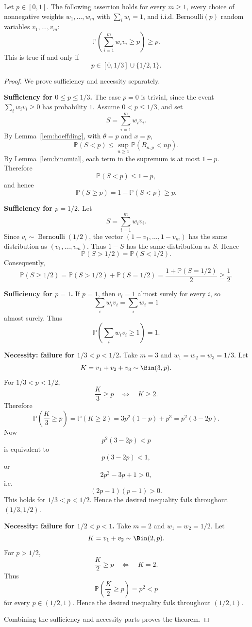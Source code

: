 \begin{theorem}
\label{thm:main}
Let \(p\in[0,1]\). The following assertion holds for every \(m\ge1\), every
choice of nonnegative weights \(w_1,\ldots,w_m\) with \(\sum_i w_i=1\), and
i.i.d. Bernoulli\((p)\) random variables \(v_1,\ldots,v_m\):
\[
\mathbb P\!\left(\sum_{i=1}^m w_i v_i\ge p\right)\ge p.
\]
This is true if and only if
\[
p\in[0,1/3]\cup\{1/2,1\}.
\]
\end{theorem}

\begin{proof}
We prove sufficiency and necessity separately.

\medskip

\noindent\textbf{Sufficiency for \(0\le p\le 1/3\).}
The case \(p=0\) is trivial, since the event
\(\sum_i w_i v_i\ge0\) has probability \(1\). Assume \(0<p\le1/3\), and set
\[
S=\sum_{i=1}^m w_i v_i .
\]
By Lemma~\ref{lem:hoeffding}, with \(\theta=p\) and \(x=p\),
\[
\mathbb P(S<p)
\le
\sup_{n\ge1}\mathbb P(B_{n,p}<np).
\]
By Lemma~\ref{lem:binomial}, each term in the supremum is at most \(1-p\).
Therefore
\[
\mathbb P(S<p)\le 1-p,
\]
and hence
\[
\mathbb P(S\ge p)=1-\mathbb P(S<p)\ge p.
\]

\medskip

\noindent\textbf{Sufficiency for \(p=1/2\).}
Let
\[
S=\sum_{i=1}^m w_i v_i .
\]
Since \(v_i\sim\operatorname{Bernoulli}(1/2)\), the vector
\((1-v_1,\ldots,1-v_m)\) has the same distribution as
\((v_1,\ldots,v_m)\). Thus \(1-S\) has the same distribution as \(S\). Hence
\[
\mathbb P(S>1/2)=\mathbb P(S<1/2).
\]
Consequently,
\[
\mathbb P(S\ge1/2)
=
\mathbb P(S>1/2)+\mathbb P(S=1/2)
=
\frac{1+\mathbb P(S=1/2)}2
\ge \frac12.
\]

\medskip

\noindent\textbf{Sufficiency for \(p=1\).}
If \(p=1\), then \(v_i=1\) almost surely for every \(i\), so
\[
\sum_i w_i v_i=\sum_i w_i=1
\]
almost surely. Thus
\[
\mathbb P\!\left(\sum_i w_i v_i\ge1\right)=1.
\]

\medskip

\noindent\textbf{Necessity: failure for \(1/3<p<1/2\).}
Take \(m=3\) and \(w_1=w_2=w_3=1/3\). Let
\[
K=v_1+v_2+v_3\sim \Bin(3,p).
\]
For \(1/3<p<1/2\),
\[
\frac K3\ge p
\quad\Longleftrightarrow\quad
K\ge2.
\]
Therefore
\[
\mathbb P\!\left(\frac K3\ge p\right)
=
\mathbb P(K\ge2)
=
3p^2(1-p)+p^3
=
p^2(3-2p).
\]
Now
\[
p^2(3-2p)<p
\]
is equivalent to
\[
p(3-2p)<1,
\]
or
\[
2p^2-3p+1>0,
\]
i.e.
\[
(2p-1)(p-1)>0.
\]
This holds for \(1/3<p<1/2\). Hence the desired inequality fails throughout
\((1/3,1/2)\).

\medskip

\noindent\textbf{Necessity: failure for \(1/2<p<1\).}
Take \(m=2\) and \(w_1=w_2=1/2\). Let
\[
K=v_1+v_2\sim \Bin(2,p).
\]
For \(p>1/2\),
\[
\frac K2\ge p
\quad\Longleftrightarrow\quad
K=2.
\]
Thus
\[
\mathbb P\!\left(\frac K2\ge p\right)=p^2<p
\]
for every \(p\in(1/2,1)\). Hence the desired inequality fails throughout
\((1/2,1)\).

Combining the sufficiency and necessity parts proves the theorem.
\end{proof}

